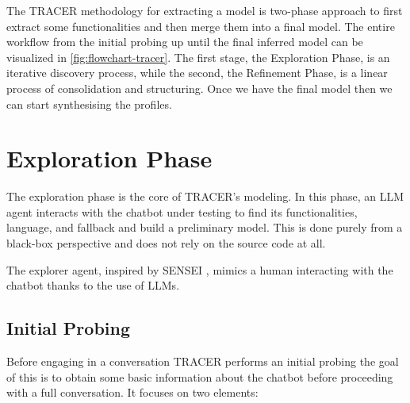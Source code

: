 The \ac{TRACER} methodology for extracting a model is two-phase approach
to first extract some functionalities and then merge them into a final model.
The entire workflow from the initial probing up until the final inferred model
can be visualized in \autoref{fig:flowchart-tracer}.
The first stage, the Exploration Phase, is an iterative discovery process,
while the second, the Refinement Phase, is a linear process of consolidation and structuring.
Once we have the final model then we can start synthesising the profiles.


\section{Exploration Phase}\label{sec:exploration}

The exploration phase is the core of \ac{TRACER}'s modeling.
In this phase, an \ac{LLM} agent interacts with the chatbot under testing
to find its functionalities, language, and fallback
and build a preliminary model.
This is done purely from a black-box perspective
and does not rely on the source code at all.

The explorer agent, inspired by SENSEI
\autocite{delaraSensei, delaraAutomatedEndtoEndTesting2025},
mimics a human interacting with the chatbot
thanks to the use of \acp{LLM}.



\subsection{Initial Probing}

Before engaging in a conversation
\ac{TRACER} performs an initial probing
the goal of this is to obtain some basic information
about the chatbot before proceeding with a full conversation.
It focuses on two elements:

